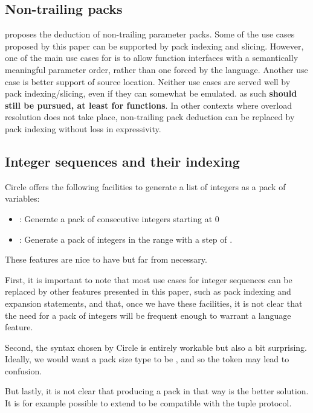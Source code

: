 \documentclass{wg21}
\begin{document}
\subsection{Non-trailing packs}

 proposes the deduction of non-trailing parameter packs.
Some of the use cases proposed by this paper can be supported by pack indexing and slicing.
However, one of the main use cases for  is to allow function interfaces with
a semantically meaningful parameter order, rather than one forced by the language.
Another use case is better support of source location.
Neither use cases are served well by pack indexing/slicing, even if they can somewhat be emulated.
as such \textbf{ should still be pursued, at least for functions}.
In other contexts where overload resolution does not take place, non-trailing pack deduction
can be replaced by pack indexing without loss in expressivity.

\subsection{Integer sequences and their indexing}

Circle offers the following facilities to generate a list of integers as a pack of variables:

\begin{itemize}
\item {} : Generate a pack of  consecutive integers starting at 0
\item {} : Generate a pack of integers in the range  with a step of .
\end{itemize}

These features are nice to have but far from necessary.

First, it is important to note that most use cases for integer sequences can be replaced by other features presented in this paper,
such as pack indexing and expansion statements, and that, once we have these facilities, it is not clear that the need for a
pack of integers will be frequent enough to warrant a language feature.

Second, the syntax chosen by Circle is entirely workable but also a bit surprising.
Ideally, we would want a pack size type to be , and so the token  may lead to confusion.

But lastly, it is not clear that producing a pack in that way is the better solution.
It is for example possible to extend  to be compatible with the tuple protocol.
\end{document}
